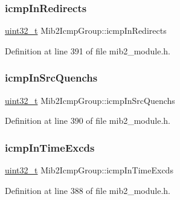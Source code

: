 \mbox{\label{structMib2IcmpGroup_a1d65f7f538b00e698054dd25d798d636}} 
\subsubsection{\texorpdfstring{icmp\+In\+Redirects}{icmpInRedirects}}
{\footnotesize\ttfamily \hyperlink{stdint_8h_a435d1572bf3f880d55459d9805097f62}{uint32\+\_\+t} Mib2\+Icmp\+Group\+::icmp\+In\+Redirects}



Definition at line 391 of file mib2\+\_\+module.\+h.

\mbox{\label{structMib2IcmpGroup_a81756bd260ba4dfd61627674c97bbed2}} 
\subsubsection{\texorpdfstring{icmp\+In\+Src\+Quenchs}{icmpInSrcQuenchs}}
{\footnotesize\ttfamily \hyperlink{stdint_8h_a435d1572bf3f880d55459d9805097f62}{uint32\+\_\+t} Mib2\+Icmp\+Group\+::icmp\+In\+Src\+Quenchs}



Definition at line 390 of file mib2\+\_\+module.\+h.

\mbox{\label{structMib2IcmpGroup_a077fdfaf27e13b801c860c457d3c8a97}} 
\subsubsection{\texorpdfstring{icmp\+In\+Time\+Excds}{icmpInTimeExcds}}
{\footnotesize\ttfamily \hyperlink{stdint_8h_a435d1572bf3f880d55459d9805097f62}{uint32\+\_\+t} Mib2\+Icmp\+Group\+::icmp\+In\+Time\+Excds}



Definition at line 388 of file mib2\+\_\+module.\+h.

